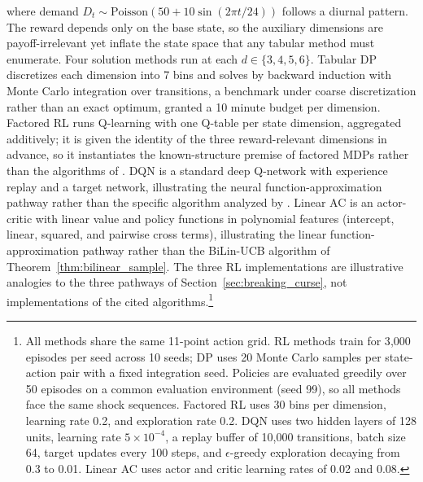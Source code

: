 where demand $D_t \sim \text{Poisson}(50 + 10 \sin(2\pi t / 24))$ follows a diurnal pattern. The reward depends only on the base state, so the auxiliary dimensions are payoff-irrelevant yet inflate the state space that any tabular method must enumerate. Four solution methods run at each $d \in \{3, 4, 5, 6\}$. Tabular DP discretizes each dimension into 7 bins and solves by backward induction with Monte Carlo integration over transitions, a benchmark under coarse discretization rather than an exact optimum, granted a 10 minute budget per dimension. Factored RL runs Q-learning with one Q-table per state dimension, aggregated additively; it is given the identity of the three reward-relevant dimensions in advance, so it instantiates the known-structure premise of factored MDPs rather than the algorithms of \citet{lu2025}. DQN is a standard deep Q-network with experience replay and a target network, illustrating the neural function-approximation pathway rather than the specific algorithm analyzed by \citet{liu2022deep}. Linear AC is an actor-critic with linear value and policy functions in polynomial features (intercept, linear, squared, and pairwise cross terms), illustrating the linear function-approximation pathway rather than the BiLin-UCB algorithm of Theorem~\ref{thm:bilinear_sample}. The three RL implementations are illustrative analogies to the three pathways of Section~\ref{sec:breaking_curse}, not implementations of the cited algorithms.\footnote{All methods share the same 11-point action grid. RL methods train for 3{,}000 episodes per seed across 10 seeds; DP uses 20 Monte Carlo samples per state-action pair with a fixed integration seed. Policies are evaluated greedily over 50 episodes on a common evaluation environment (seed 99), so all methods face the same shock sequences. Factored RL uses 30 bins per dimension, learning rate 0.2, and exploration rate 0.2. DQN uses two hidden layers of 128 units, learning rate $5 \times 10^{-4}$, a replay buffer of 10{,}000 transitions, batch size 64, target updates every 100 steps, and $\epsilon$-greedy exploration decaying from 0.3 to 0.01. Linear AC uses actor and critic learning rates of 0.02 and 0.08.}

